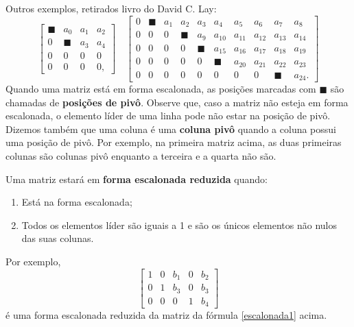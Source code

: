 Outros exemplos, retirados livro do David C. Lay:
\begin{equation}
\left[
\begin{array}{cccc}
\blacksquare & a_0 & a_1 & a_2 \\
0 & \blacksquare & a_3 & a_4 \\
0 & 0 & 0 & 0 \\
0 & 0 & 0 & 0,
\end{array}
\right] \quad
\left[
\begin{array}{cccccccccc}
0 & \blacksquare & a_1 & a_2 & a_3 & a_4 & a_5 & a_6 & a_7 & a_8\\
0 & 0 & 0 & \blacksquare & a_9 & a_{10} & a_{11} & a_{12} & a_{13} & a_{14}\\
0 & 0 & 0 & 0 & \blacksquare & a_{15} & a_{16} & a_{17} & a_{18} & a_{19}\\
0 & 0 & 0 & 0 & 0 & \blacksquare & a_{20} & a_{21} & a_{22} & a_{23} \\
0 & 0 & 0 & 0 & 0 & 0 & 0 & 0 & \blacksquare & a_{24}.
\end{array}
\right]
\end{equation} Quando uma matriz está em forma escalonada, as posições marcadas com $\blacksquare$ são chamadas de \textbf{posições de pivô}. Observe que, caso a matriz não esteja em forma escalonada, o elemento líder de uma linha pode não estar na posição de pivô. Dizemos também que uma coluna é uma \textbf{coluna pivô} quando a coluna possui uma posição de pivô. Por exemplo, na primeira matriz acima, as duas primeiras colunas são colunas pivô enquanto a terceira e a quarta não são.

\vspace{0.2cm}

Uma matriz estará em \textbf{forma escalonada reduzida} quando:
\begin{enumerate}
  \item Está na forma escalonada;
  \item Todos os elementos líder são iguais a 1 e são os únicos elementos não nulos das suas colunas.
\end{enumerate} Por exemplo,
\begin{equation}
\left[
\begin{array}{ccccc}
   1 & 0 & b_{1} & 0 & b_{2}\\
   0 & 1 & b_{3} & 0 & b_{3}\\
   0 & 0 & 0 & 1 & b_{4}
\end{array}
\right]
\end{equation} é uma forma escalonada reduzida da matriz da fórmula \eqref{escalonada1} acima.

